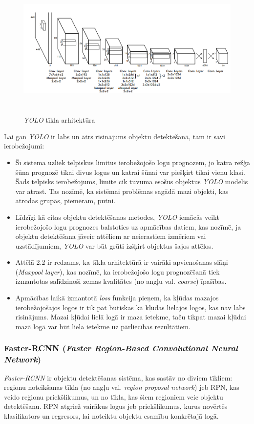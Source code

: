 \begin{figure}[h]%
	\centering
	\includegraphics[height=7cm]{images/yoloarch.png} %
	\caption{\textit{YOLO} tīkla arhitektūra \cite{redmon2016you}}%
	\label{fig:example}%
\end{figure}
\newpage
Lai gan \textit{YOLO} ir labs un ātrs risinājums objektu detektēšanā, tam ir savi ierobežojumi:
\begin{itemize}
	\item Šī sistēma uzliek telpiskus limitus ierobežojošo logu prognozēm, jo katra režģa šūna prognozē tikai divus logus un katrai šūnai var piešķirt tikai vienu klasi. Šāds telpisks ierobežojums, limitē cik tuvumā esošus objektus \textit{YOLO} modelis var atrast. Tas nozīmē, ka sistēmai problēmas sagādā mazi objekti, kas atrodas grupās, piemēram, putni.
	\item Līdzīgi kā citas objektu detektēšanas metodes, \textit{YOLO} iemācās veikt ierobežojošo logu prognozes balstoties uz apmācības datiem, kas nozīmē, ja objektu detektēšana jāveic attēliem ar neierastiem izmēriem vai uzstādījumiem, \textit{YOLO} var būt grūti izšķirt objektus šajos attēlos.
	\item Attēlā 2.2 ir redzams, ka tīkla arhitektūrā ir vairāki apvienošanas slāņi (\textit{Maxpool layer}), kas nozīmē, ka ierobežojošo logu prognozēšanā tiek izmantotas salīdzinoši zemas kvalitātes (no angļu val. \textit{coarse}) īpašības. 
	\item Apmācības laikā izmantotā \textit{loss} funkcija pieņem, ka kļūdas mazajos ierobežojošajos logos ir tik pat būtiskas kā kļūdas lielajos logos, kas nav labs risinājums. Mazai kļūdai lielā logā ir maza ietekme, taču tikpat mazai kļūdai mazā logā var būt liela ietekme uz pārliecības rezultātiem. 
\end{itemize}   

\subsubsection{Faster-RCNN (\textit{Faster Region-Based Convolutional Neural Network})}
\textit{Faster-RCNN} ir objektu detektēšanas sistēma, kas sastāv no diviem tīkliem: reģionu noteikšanas tīkla (no angļu val. \textit{region proposal network}) jeb RPN, kas veido reģionu priekšlikumus, un no tīkla, kas šiem reģioniem veic objektu detektēšanu. RPN atgriež vairākus logus jeb priekšlikumus, kurus novērtēs klasifikators un regresors, lai noteiktu objektu esamību konkrētajā logā.

